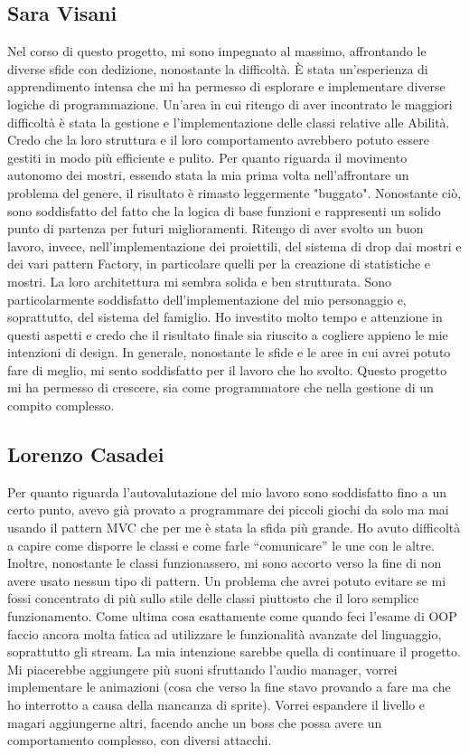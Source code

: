 \documentclass[a4paper,12pt]{report}
\begin{document}
\subsection{Sara Visani}

Nel corso di questo progetto, mi sono impegnato al massimo, affrontando le diverse sfide con dedizione, nonostante la difficoltà. È stata un'esperienza di apprendimento intensa che mi ha permesso di esplorare e implementare diverse logiche di programmazione.
Un'area in cui ritengo di aver incontrato le maggiori difficoltà è stata la gestione e l'implementazione delle classi relative alle Abilità. Credo che la loro struttura e il loro comportamento avrebbero potuto essere gestiti in modo più efficiente e pulito.
Per quanto riguarda il movimento autonomo dei mostri, essendo stata la mia prima volta nell'affrontare un problema del genere, il risultato è rimasto leggermente "buggato". Nonostante ciò, sono soddisfatto del fatto che la logica di base funzioni e rappresenti un solido punto di partenza per futuri miglioramenti.
Ritengo di aver svolto un buon lavoro, invece, nell'implementazione dei proiettili, del sistema di drop dai mostri e dei vari pattern Factory, in particolare quelli per la creazione di statistiche e mostri. La loro architettura mi sembra solida e ben strutturata.
Sono particolarmente soddisfatto dell'implementazione del mio personaggio e, soprattutto, del sistema del famiglio. Ho investito molto tempo e attenzione in questi aspetti e credo che il risultato finale sia riuscito a cogliere appieno le mie intenzioni di design.
In generale, nonostante le sfide e le aree in cui avrei potuto fare di meglio, mi sento soddisfatto per il lavoro che ho svolto. Questo progetto mi ha permesso di crescere, sia come programmatore che nella gestione di un compito complesso.

\subsection{Lorenzo Casadei}

Per quanto riguarda l’autovalutazione del mio lavoro sono soddisfatto fino a un certo punto, avevo già provato a programmare dei piccoli giochi da solo ma mai usando il pattern MVC che per me è stata la sfida più grande. Ho avuto difficoltà a capire come disporre le classi e come farle “comunicare” le une con le altre. Inoltre, nonostante le classi funzionassero, mi sono accorto verso la fine di non avere usato nessun tipo di pattern. Un problema che avrei potuto evitare se mi fossi concentrato di più sullo stile delle classi piuttosto che il loro semplice funzionamento. 
Come ultima cosa esattamente come quando feci l’esame di OOP faccio ancora molta fatica ad utilizzare le funzionalità avanzate del linguaggio, soprattutto gli stream.
La mia intenzione sarebbe quella di continuare il progetto. Mi piacerebbe aggiungere più suoni sfruttando l’audio manager, vorrei implementare le animazioni (cosa che verso la fine stavo provando a fare ma che ho interrotto a causa della mancanza di sprite). 
Vorrei espandere il livello e magari aggiungerne altri, facendo anche un boss che possa avere un comportamento complesso, con diversi attacchi. 
\end{document}
